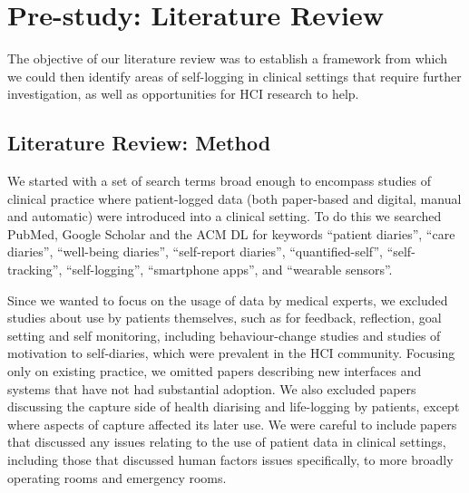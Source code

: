 \documentclass{sigchi}
\begin{document}


\section{Pre-study: Literature Review} 

 The objective of our literature review was to establish a framework from which we could then identify areas of self-logging in clinical settings that require further investigation, as well as opportunities for HCI research to help.  

\subsection{Literature Review: Method}

We started with a set of search terms broad enough to encompass studies of clinical practice where patient-logged data (both paper-based and digital, manual and automatic) were introduced into a clinical setting.  To do this we searched PubMed, Google Scholar and the ACM DL for keywords ``patient diaries'', ``care diaries'', ``well-being diaries'', ``self-report diaries'', ``quantified-self'', ``self-tracking'', ``self-logging'', ``smartphone apps'', and ``wearable sensors''.

Since we wanted to focus on the usage of data by medical experts, we excluded studies about use by patients themselves, such as for feedback, reflection, goal setting and self monitoring, including behaviour-change studies and studies of motivation to self-diaries, which were prevalent in the HCI community.   Focusing only on existing practice, we omitted papers describing new interfaces and systems that have not had substantial adoption.  We also excluded papers discussing the capture side of health diarising and life-logging by patients, except where aspects of capture affected its later use.  We were careful to include papers that discussed any issues relating to the use of patient data in clinical settings, including those that discussed human factors issues specifically, to more broadly operating rooms and emergency rooms.
\end{document}
